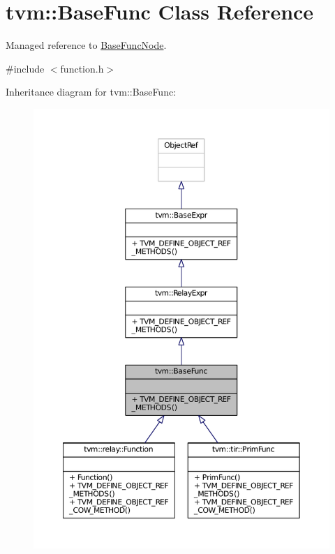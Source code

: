 \hypertarget{classtvm_1_1BaseFunc}{}\section{tvm\+:\+:Base\+Func Class Reference}
\label{classtvm_1_1BaseFunc}


Managed reference to \hyperlink{classtvm_1_1BaseFuncNode}{Base\+Func\+Node}.  




{\ttfamily \#include $<$function.\+h$>$}



Inheritance diagram for tvm\+:\+:Base\+Func\+:
\nopagebreak
\begin{figure}[H]
\begin{center}
\leavevmode
\includegraphics[width=350pt]{classtvm_1_1BaseFunc__inherit__graph}
\end{center}
\end{figure}


